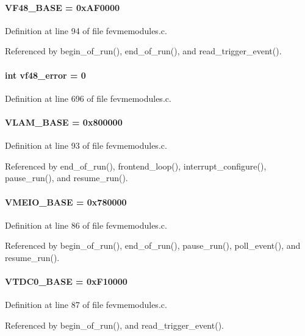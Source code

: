 \paragraph[{VF48\_\-BASE}]{ {\bf VF48\_\-BASE} = 0xAF0000}\hfill\label{fevmemodules_8c_a7675505ab96ded09e577ea510c2900e0}


Definition at line 94 of file fevmemodules.c.

Referenced by begin\_\-of\_\-run(), end\_\-of\_\-run(), and read\_\-trigger\_\-event().
\paragraph[{vf48\_\-error}]{\setlength{\rightskip}{0pt plus 5cm}int {\bf vf48\_\-error} = 0}\hfill\label{fevmemodules_8c_a8883ccfed3c0d566cf3e4cf5637fd70d}


Definition at line 696 of file fevmemodules.c.
\paragraph[{VLAM\_\-BASE}]{ {\bf VLAM\_\-BASE} = 0x800000}\hfill\label{fevmemodules_8c_af9e70d396f8271dc89a6ca33f9b540bc}


Definition at line 93 of file fevmemodules.c.

Referenced by end\_\-of\_\-run(), frontend\_\-loop(), interrupt\_\-configure(), pause\_\-run(), and resume\_\-run().
\paragraph[{VMEIO\_\-BASE}]{ {\bf VMEIO\_\-BASE} = 0x780000}\hfill\label{fevmemodules_8c_aa914897ada170e3d2b39940ef62467cf}


Definition at line 86 of file fevmemodules.c.

Referenced by begin\_\-of\_\-run(), end\_\-of\_\-run(), pause\_\-run(), poll\_\-event(), and resume\_\-run().
\paragraph[{VTDC0\_\-BASE}]{ {\bf VTDC0\_\-BASE} = 0xF10000}\hfill\label{fevmemodules_8c_a72f046e5198d0a8f6f8a18ec0c142b07}


Definition at line 87 of file fevmemodules.c.

Referenced by begin\_\-of\_\-run(), and read\_\-trigger\_\-event().
